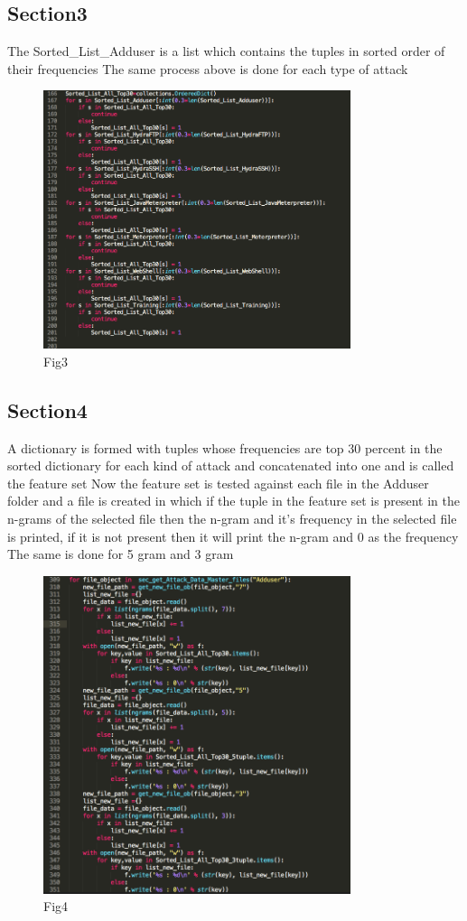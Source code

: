\documentclass[a4paper,11pt]{article}
\begin{document}
\subsection{Section3} \newpage
The Sorted\_List\_Adduser is a list which contains the tuples in sorted order of their frequencies
The same process above is done for each type of attack
\begin{figure}[ht!]
\centering
\includegraphics[width=90mm]{2.png}
\caption{Fig3\label{ooo}}
\end{figure}

\subsection{Section4} \newpage
A dictionary is formed with tuples whose frequencies are top 30 percent in the sorted dictionary for each kind of attack and concatenated into one and is called the feature set
Now the feature set is tested against each file in the Adduser folder and a file is created in which if the tuple in the feature set is present in the n-grams of the selected file then the n-gram and it’s frequency in the selected file is printed, if it is not present then it will print the n-gram and 0 as the frequency
The same is done for 5 gram and 3 gram

\begin{figure}[ht!]
\centering
\includegraphics[width=90mm]{1.png}
\caption{Fig4\label{ooo}}
\end{figure}
\end{document}
